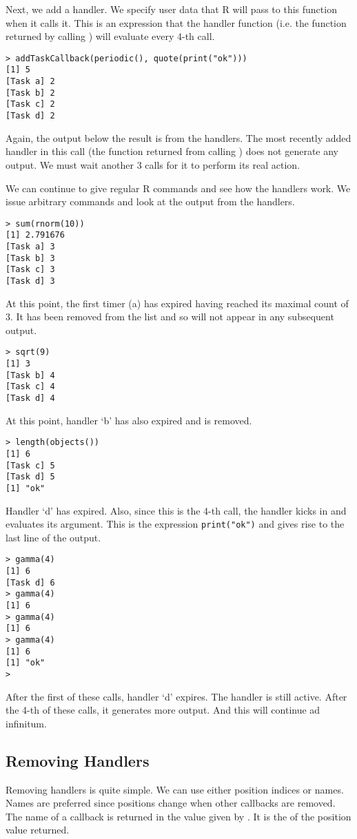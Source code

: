 \documentclass{article}
\begin{document}
Next, we add a  handler.  We specify user data
that R will pass to this function when it calls it.  This is an
expression that the handler function (i.e. the function returned by
calling ) will evaluate every 4-th call.
\begin{verbatim}
> addTaskCallback(periodic(), quote(print("ok")))
[1] 5
[Task a] 2
[Task b] 2
[Task c] 2
[Task d] 2
\end{verbatim}
Again, the output below the result is from the handlers. The most
recently added handler in this call (the function returned from
calling ) does not generate any output.
We must wait another 3 calls for it to perform its real action. 

We can continue to give regular R commands and see how the handlers
work. We issue arbitrary commands and look at the output from the
handlers.
\begin{verbatim}
> sum(rnorm(10))
[1] 2.791676
[Task a] 3
[Task b] 3
[Task c] 3
[Task d] 3
\end{verbatim}
At this point, the first timer (a) has expired having reached its
maximal count of $3$.  It has been removed from the list
and so will not appear in any subsequent output.

\begin{verbatim}
> sqrt(9)
[1] 3
[Task b] 4
[Task c] 4
[Task d] 4
\end{verbatim}
At this point, handler `b' has also expired and is removed.

\begin{verbatim}
> length(objects())
[1] 6
[Task c] 5
[Task d] 5
[1] "ok"
\end{verbatim}
Handler `d' has expired. Also, since this is the 4-th
call, the  handler kicks in and
evaluates its  argument. This is the
expression \verb+print("ok")+ and gives rise to the
last line of the output.

\begin{verbatim}
> gamma(4)
[1] 6
[Task d] 6
> gamma(4)
[1] 6
> gamma(4)
[1] 6
> gamma(4)
[1] 6
[1] "ok"
> 
\end{verbatim}
After the first of these calls, handler `d' expires.  The
 handler is still active.  After the 4-th of these
calls, it generates more output.  And this will continue ad infinitum.


\subsection{Removing Handlers}
Removing handlers is quite simple.  We can use either position indices
or names.  Names are preferred since positions change when other
callbacks are removed.  The name of a callback is returned in the
value given by .  It is the
 of the position value returned.
\end{document}
